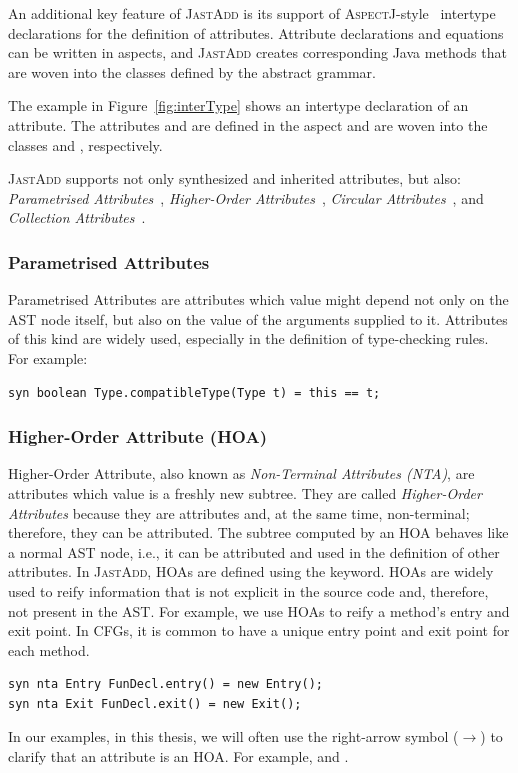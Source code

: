 An additional key feature of \textsc{JastAdd} is its support of \textsc{AspectJ}-style~\cite{Kiczales1997Aspect} intertype
declarations for the definition of attributes.
Attribute declarations and equations can be written in aspects, and \textsc{JastAdd}
creates corresponding Java methods that are woven into the classes defined by the abstract grammar.

The example in Figure~\ref{fig:interType}
shows an intertype declaration of an attribute.
The attributes  and  are defined in the aspect 
and are woven into the classes  and , respectively.

\textsc{JastAdd} supports not only synthesized and inherited attributes, but also:
\emph{Parametrised Attributes}~\cite{hedin2000rags}, \emph{Higher-Order Attributes}~\cite{vogt1989higher}, \emph{Circular Attributes}~\cite{MAGNUSSON200721}, and \emph{Collection Attributes}~\cite{boyland1996descriptional}.


\subsubsection*{Parametrised Attributes} Parametrised Attributes are attributes which value might depend
    not only on the AST node itself, but also on the value of the arguments supplied
    to it. Attributes of this kind are widely used, especially in the definition of
    type-checking rules. For example:
    \begin{lstlisting}[language=JastAdd]
syn boolean Type.compatibleType(Type t) = this == t;
    \end{lstlisting}

    \subsubsection*{Higher-Order Attribute (HOA)} Higher-Order Attribute, also known as \emph{Non-Terminal Attributes (NTA)}, are attributes which
    value is a freshly new subtree. They are called \emph{Higher-Order Attributes}
    because they are attributes and, at the same time, non-terminal; therefore, they can be attributed.
    The subtree computed by an HOA behaves like a normal AST node, i.e., it can be
    attributed and used in the definition of other attributes. In \textsc{JastAdd}, HOAs
    are defined using the  keyword. HOAs are widely used to reify information
    that is not explicit in the source code and, therefore, not present in the AST.
    For example, we use HOAs to reify a method's entry and exit point. In CFGs, it
    is common to have a unique entry point and exit point for each method.
    \begin{lstlisting}[language=JastAdd]
syn nta Entry FunDecl.entry() = new Entry();
syn nta Exit FunDecl.exit() = new Exit();
    \end{lstlisting}
    In our examples, in this thesis, we will often use the right-arrow symbol (\textcolor{ATGsym}{$\rightarrow$}) to
    clarify that an attribute is an HOA. For example,  and .
